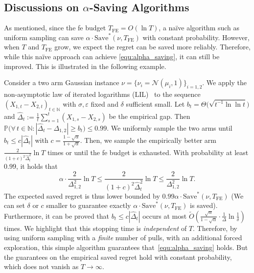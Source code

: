 \documentclass[twoside,11pt]{article}
\newcommand{\calN}{\mathcal{N}}
\newcommand{\bbN}{\mathbb{N}}
\newcommand{\bbP}{\mathbb{P}}
\newcommand{\Tfe}{T_{\mathrm{FE}}}
\newcommand{\Saved}{\mathrm{Save}}
\begin{document}
\subsection{Discussions on $\alpha$-Saving Algorithms}\label{app:discussions}
As mentioned, since the \ac{fe} budget $\Tfe=O(\ln T)$, a na\"ive algorithm such as uniform sampling can save $\alpha\cdot\Saved^*(\nu,\Tfe)$ with constant probability.
However, when $T$ and $\Tfe$ grow, we expect the regret can be saved more reliably. Therefore, while this na\"ive approach can achieve \eqref{equ:alpha_saving}, it can still be improved.
This is illustrated in the following example. 
\begin{example}\label{exmp1}
    Consider a two arm Gaussian instance $\nu=\{\nu_i=\calN(\mu_i,1)\}_{i=1,2}$. We apply the non-asymptotic law of iterated logarithms (LIL)~\citep[Lemma 3]{jamiesonlilucb2014} to the sequence  $(X_{1,t}-X_{2,t})_{t\in\bbN}$ with
    $\sigma, \varepsilon$ fixed and $\delta$ sufficient small. Let $b_t = \Theta\big( \sqrt{t^{-1} \ln\ln t} \big)$ and $ \hat{\Delta}_t := \frac{1}{t}\sum_{s=1}^t ( X_{1,s}-X_{2,s} )$
    be the empirical gap.
    Then $\bbP\big(\forall\, t \in \bbN: |\hat{\Delta}_t-\Delta_{1,2}|\geq b_t \big)\leq 0.99.$ 
    We uniformly sample the two arms until $b_t\leq c|\hat{\Delta}_t|$ with $c=\frac{1-\sqrt{\alpha}}{1+\sqrt{\alpha}}$. Then, we sample the empirically better arm  $\frac{2}{(1+c)^2\hat{\Delta}_t^2}\ln T$ times or until the \ac{fe} budget is exhausted. With probability at least $0.99$, it holds that
    $$
        \alpha\cdot \frac{2}{\Delta_{1,2}^2}\ln T
        \leq 
        \frac{2}{(1+c)^2\hat{\Delta}_t^2}\ln T
        \leq 
        \frac{2}{\Delta_{1,2}^2}\ln T. 
    $$
    The expected saved regret is thus lower bounded by $0.99\alpha\cdot \Saved^*(\nu,\Tfe)$ (We can set $\delta$ or $c$ smaller to guarantee exactly $\alpha\cdot \Saved^*(\nu,\Tfe)$ is saved).
    Furthermore, it can be proved that $b_t\leq c|\hat{\Delta}_t| $ occurs at most $\tilde{O}(\frac{\sqrt{\alpha}}{1-\sqrt{\alpha}}\cdot\frac{1}{\Delta}\ln\frac{1}{\delta})$ times.
    We highlight that this stopping time is \emph{independent} of $T$.
    Therefore, by using uniform sampling with a \emph{finite} number of pulls, with an additional forced exploration, this simple algorithm guarantees that~\eqref{equ:alpha_saving} holds. But the guarantees on the empirical saved regret hold with constant probability, which does not vanish as $T\to\infty$.
\end{example}
\end{document}
